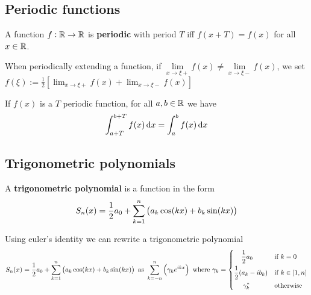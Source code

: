 \documentclass[../Year1/Year1.tex]{subfiles}
\begin{document}
\subsection{Periodic functions}

\begin{definition}
    A function $f:\mathbb{R}\rightarrow\mathbb{R}$ is \textbf{periodic} with period $T$ iff $f(x+T)=f(x)$ for all $x\in\mathbb{R}$.
\end{definition}

\begin{definition}[Discontinuity]
    When periodically extending a function, if $\lim\limits_{x\rightarrow\xi+}f(x) \neq \lim\limits_{x\rightarrow\xi-}f(x)$, we set $\displaystyle f(\xi):=\frac{1}{2}\left[\lim_{x\rightarrow\xi+}f(x) + \lim_{x\rightarrow\xi-}f(x)\right]$
\end{definition}

\begin{theorem}
    If $f(x)$ is a $T$ periodic function, for all $a,b\in\mathbb{R}$ we have \[
        \intd{a+T}{b+T}{f(x)}{x} = \intd{a}{b}{f(x)}{x}
    \]
\end{theorem}

\subsection{Trigonometric polynomials}

\begin{definition}
    A \textbf{trigonometric polynomial} is a function in the form \[
        S_n(x) = \frac{1}{2}a_0 + \sum_{k=1}^n\br{a_k\cos(kx)+b_k\sin(kx)}
    \]
\end{definition}

\begin{theorem}
    Using euler's identity we can rewrite a trigonometric polynomial \[
        S_n(x) = \frac{1}{2}a_0 + \sum_{k=1}^n\br{a_k\cos(kx)+b_k\sin(kx)} \ \text{\textcolor{black}{as }} \sum_{k=-n}^n\br{\gamma_ke^{ikx}} \ \text{\textcolor{black}{where }}
        \gamma_k = \begin{dcases}
            \hfil\frac{1}{2}a_0\hfil & \text{\textcolor{black}{if }} k=0 \\
            \frac{1}{2}(a_k-ib_k) & \text{\textcolor{black}{if }} k\in[1,n] \\
            \hfil\gamma_k^*\hfil & \text{\textcolor{black}{otherwise}} 
        \end{dcases}
    \]
\end{theorem}
\end{document}
